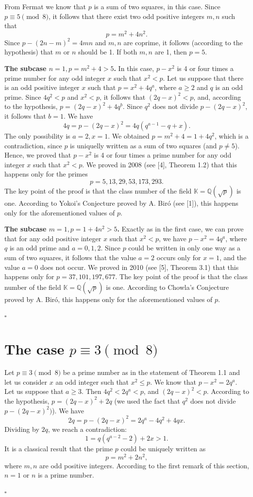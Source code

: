 \documentclass[12pt]{article}
\newenvironment{proof}{{\it Proof.}}{\hfill $ \square $ \vskip 4mm}
\begin{document}
{\begin{proof} From Fermat we know that $p$ is a sum of two squares, in this case. Since $p\equiv 5 \pmod 8$, it follows that there exist two odd positive integers $m,n$ such that 
$$p=m^2+4n^2.$$ Since $p-(2n-m)^2=4mn$ and $m,n$ are coprime, it follows (according to the hypothesis) that $m$ or $n$ should be 1. If both $m,n$ are 1, then $p=5$. 

{\bf The subcase $n=1,p=m^2+4>5$. } In this case, $p-x^2$ is 4 or four times a prime number for any odd integer $x$ such that $x^2<p$. Let us suppose that there is an odd positive integer $x$ such that $p=x^2+4q^a$, where $a\geq 2$ and $q$ is an odd prime. Since $4q^2<p$ and $x^2<p$, it follows that $(2q-x)^2<p$, and, according to the hypothesis, $p=(2q-x)^2+4q^b$. Since $q^2$ does not divide $p-(2q-x)^2$, it follows that $b=1$. We have
$$4q=p-(2q-x)^2=4q(q^{a-1}-q+x).$$ The only possibility is $a=2, x=1$. We obtained $p=m^2+4=1+4q^2$, which is a contradiction, since $p$ is uniquelly written as a sum of two squares (and $p\neq 5$). Hence, we proved that $p-x^2$ is 4 or four times a prime number for any odd integer $x$ such that $x^2<p$. We proved in 2008 (see [4], Theorem 1.2) that this happens only for the primes 
$$p=5,13,29,53,173,293.$$ The key point of the proof is that the class number of the field $\mathbb{K}=\mathbb{Q}(\sqrt {p})$ is one. According to Yokoi's Conjecture proved by A. Bir\'{o} (see [1]), this happens only for the aforementioned values of $p$.

{\bf The subcase $m=1,p=1+4n^2>5$. } Exactly as in the first case, we can prove that for any odd positive integer $x$ such that $x^2<p$, we have $p-x^2=4q^a$, where $q$ is an odd prime and $a=0,1,2$. Since $p$ could be written in only one way as a sum of two squares, it follows that the value $a=2$ occurs only for $x=1$, and the value $a=0$ does not occur. We proved in 2010 (see [5], Theorem 3.1) that this happens only for $p=37,101,197,677.$ The key point of the proof is that the class number of the field $\mathbb{K}=\mathbb{Q}(\sqrt {p})$ is one. According to Chowla's Conjecture proved by A. Bir\'{o}, this happens only for the aforementioned values of $p$.

\end{proof}


\section{ The case $p\equiv 3 \pmod 8$}

\begin{proof} Let $p\equiv 3 \pmod 8$ be a prime number as in the statement of Theorem 1.1 and let us consider $x$ an odd integer such that $x^2\leq p$. We know that $p-x^2=2q^a$. Let us suppose that $a\geq 3$. Then $4q^2<2q^a<p$, and $(2q-x)^2<p$. According to the hypothesis, $p=(2q-x)^2+2q$ (we used the fact that $q^2$ does not divide $p-(2q-x)^2)$). We have 
$$2q=p-(2q-x)^2=2q^a-4q^2+4qx.$$
Dividing by $2q$, we reach a contradiction:
$$1=q(q^{a-2}-2)+2x>1.$$
It is a classical result that the prime $p$ could be uniquely written as $$p=m^2+2n^2,$$ where $m,n$ are odd positive integers. According to the first remark of this section, $n=1$ or $n$ is a prime number.


\end{proof}}
\end{document}
